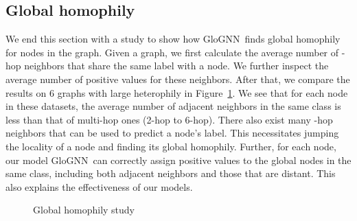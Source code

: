 \documentclass[nohyperref]{article}
\theoremstyle{plain}
\theoremstyle{definition}
\theoremstyle{remark}
\newcommand{\ada}{GloGNN}
\begin{document}
\subsection{Global homophily}
We end this section with a study to show how \ada\ finds global homophily for nodes in the graph.
Given a graph,
we first calculate the average number of -hop neighbors that share the same label with a node. 
We further inspect the average number of positive  values for these neighbors.
After that,
we compare the results on 6 graphs with large heterophily in Figure~\ref{figure:globalfriends}.
We see that
for each node in these datasets,
the average number of adjacent neighbors in the same class
is less than that of multi-hop
ones (2-hop to 6-hop).
There also exist many -hop neighbors that can be used to predict a node's label.
This necessitates jumping the locality of a node and finding its global homophily.
Further,
for each node,
our model \ada\ can correctly assign positive values to the global nodes in the same class,
including both adjacent neighbors
and those that are distant.
This also explains the effectiveness of our models.

\begin{figure}[!htbp]
    \centering  
     \caption{Global homophily study}
     \label{figure:globalfriends}
\end{figure}
\end{document}

